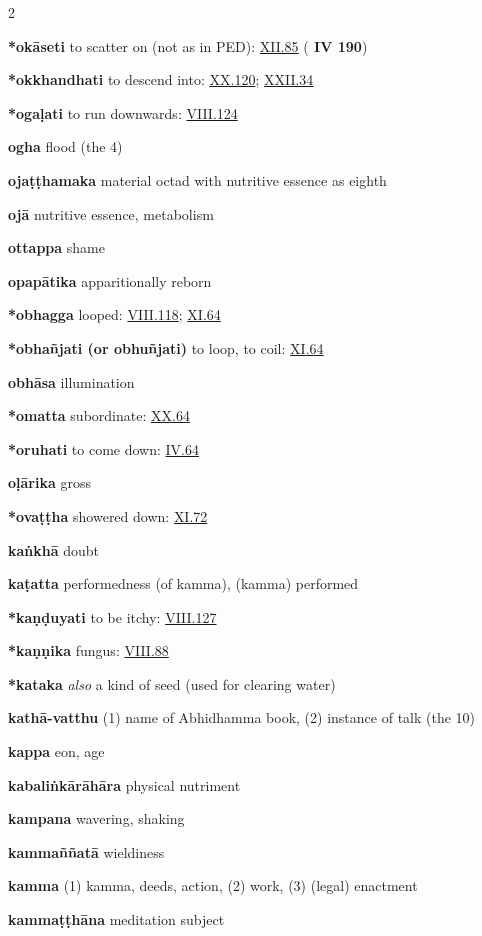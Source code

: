 \begin{multicols}{2}
\begin{vismHanging}
\par\textbf{*okāseti} to scatter on (not as in PED): \hyperlink{XII.85}{XII.85}{} (\textbf{\cite{S} IV 190}) 
\par\textbf{*okkhandhati} to descend into: \hyperlink{XX.120}{XX.120}{}; \hyperlink{XXII.34}{XXII.34}{} 
\par\textbf{*ogaḷati} to run downwards: \hyperlink{VIII.124}{VIII.124}{} 
\par\textbf{ogha} flood (the 4)
\par\textbf{ojaṭṭhamaka} material octad with nutritive essence as eighth 
\par\textbf{ojā} nutritive essence, metabolism
\par\textbf{ottappa} shame
\par\textbf{opapātika} apparitionally reborn
\par\textbf{*obhagga} looped: \hyperlink{VIII.118}{VIII.118}{}; \hyperlink{XI.64}{XI.64}{} 
\par\textbf{*obhañjati (or obhuñjati)} to loop, to coil: \hyperlink{XI.64}{XI.64}{} 
\par\textbf{obhāsa} illumination
\par\textbf{*omatta} subordinate: \hyperlink{XX.64}{XX.64}{}
\par\textbf{*oruhati} to come down: \hyperlink{IV.64}{IV.64}{}
\par\textbf{oḷārika} gross
\par\textbf{*ovaṭṭha} showered down: \hyperlink{XI.72}{XI.72}{}
\par\textbf{kaṅkhā} doubt
\par\textbf{kaṭatta} performedness (of kamma), (kamma) performed 
\par\textbf{*kaṇḍuyati} to be itchy: \hyperlink{VIII.127}{VIII.127}{}
\par\textbf{*kaṇṇika} fungus: \hyperlink{VIII.88}{VIII.88}{}
\par\textbf{*kataka} \emph{also }a kind of seed (used for clearing water) 
\par\textbf{kathā-vatthu} (1) name of Abhidhamma book, (2) instance of talk (the 10) 
\par\textbf{kappa} eon, age
\par\textbf{kabaliṅkārāhāra} physical nutriment
\par\textbf{kampana} wavering, shaking
\par\textbf{kammaññatā} wieldiness
\par\textbf{kamma} (1) kamma, deeds, action, (2) work, (3) (legal) enactment 
\par\textbf{kammaṭṭhāna} meditation subject

\end{vismHanging}
\end{multicols}
